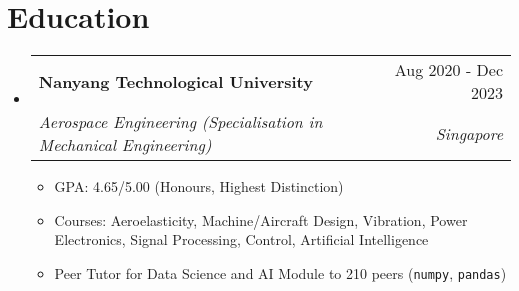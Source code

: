 \documentclass[letterpaper,11pt]{article}
\makeatletter
\newcommand{\resumeItem}[1]{
  \item{
    {#1 \vspace{-4pt}}
  }
}
\newcommand{\resumeSubheading}[4]{
  \vspace{-4pt}\item
    \begin{tabular*}{0.97\textwidth}[t]{l@{\extracolsep{\fill}}r}
      \textbf{#1} & #2 \\
      \textit{\small #3} & \textit{\small #4} \\
    \end{tabular*}\vspace{-10pt}
}
\newcommand{\resumeSubHeadingListStart}{\begin{itemize}[leftmargin=0.15in, label={}]}
\newcommand{\resumeSubHeadingListEnd}{\end{itemize}}
\newcommand{\resumeItemListStart}{\begin{itemize}}
\newcommand{\resumeItemListEnd}{\end{itemize}\vspace{-2pt}}
\makeatother
\begin{document}
\section{Education}
\resumeSubHeadingListStart
    \resumeSubheading
        {Nanyang Technological University}{Aug 2020 - Dec 2023}
        {Aerospace Engineering (Specialisation in Mechanical Engineering)}{Singapore} 
        
        \resumeItemListStart
        \small
        \resumeItem{GPA: 4.65/5.00 (Honours, Highest Distinction)}
        \resumeItem{Courses: Aeroelasticity, Machine/Aircraft Design, Vibration, Power Electronics,
        Signal Processing, Control, Artificial Intelligence}
        \resumeItem{Peer Tutor for Data Science and AI Module to 210 peers (\texttt{numpy}, \texttt{pandas})}
        \resumeItemListEnd
\resumeSubHeadingListEnd
\end{document}
